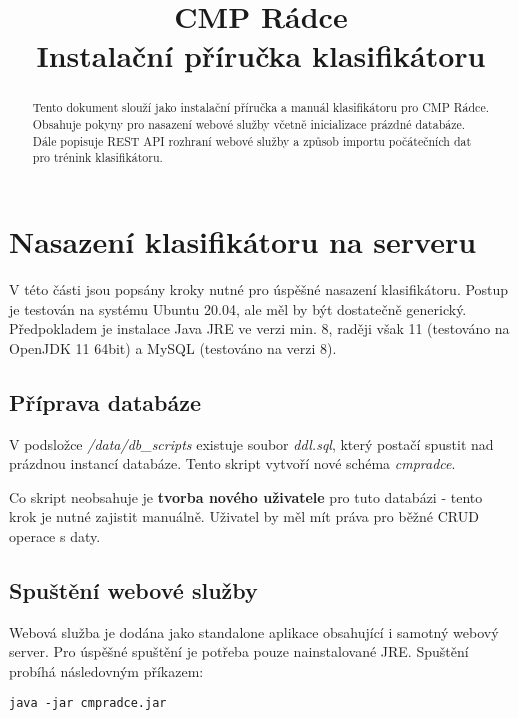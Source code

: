 \documentclass{article}
\begin{document}
\title{CMP Rádce \\ Instalační příručka klasifikátoru}

\maketitle

\begin{abstract}
Tento dokument slouží jako instalační příručka a manuál klasifikátoru pro CMP Rádce. Obsahuje pokyny pro nasazení webové služby včetně inicializace prázdné databáze. Dále popisuje REST API rozhraní webové služby a způsob importu počátečních dat pro trénink klasifikátoru.
\end{abstract}

\section{Nasazení klasifikátoru na serveru}
V této části jsou popsány kroky nutné pro úspěšné nasazení klasifikátoru. Postup je testován na systému Ubuntu 20.04, ale měl by být dostatečně generický. Předpokladem je instalace Java JRE ve verzi min. 8, raději však 11 (testováno na OpenJDK 11 64bit) a MySQL (testováno na verzi 8).

\subsection{Příprava databáze}
\label{subsec:db}

V podsložce \textit{/data/db\_scripts} existuje soubor \textit{ddl.sql}, který postačí spustit nad prázdnou instancí databáze. Tento skript vytvoří nové schéma \textit{cmpradce}.

Co skript neobsahuje je \textbf{tvorba nového uživatele} pro tuto databázi - tento krok je nutné zajistit manuálně. Uživatel by měl mít práva pro běžné CRUD operace s daty.

\subsection{Spuštění webové služby}

Webová služba je dodána jako standalone aplikace obsahující i samotný webový server. Pro úspěšné spuštění je potřeba pouze nainstalované JRE. Spuštění probíhá následovným příkazem:

\begin{verbatim}
java -jar cmpradce.jar
\end{verbatim}
\end{document}
